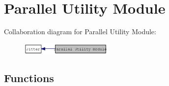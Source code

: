 \hypertarget{group__parallelutilmod}{
\section{Parallel Utility Module}
\label{group__parallelutilmod}
}


Collaboration diagram for Parallel Utility Module:\nopagebreak
\begin{figure}[H]
\begin{center}
\leavevmode
\includegraphics[width=128pt]{group__parallelutilmod}
\end{center}
\end{figure}
\subsection*{Functions}
